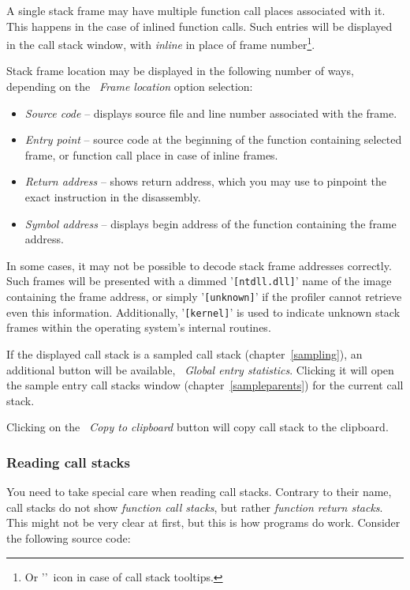 \documentclass[hidelinks,titlepage,a4paper]{article}
\begin{document}
A single stack frame may have multiple function call places associated with it. This happens in the case of inlined function calls. Such entries will be displayed in the call stack window, with \emph{inline} in place of frame number\footnote{Or '\faCaretRight{}'~icon in case of call stack tooltips.}.

Stack frame location may be displayed in the following number of ways, depending on the \emph{\faAt{}~Frame location} option selection:

\begin{itemize}
\item \emph{Source code} -- displays source file and line number associated with the frame.
\item \emph{Entry point} -- source code at the beginning of the function containing selected frame, or function call place in case of inline frames.
\item \emph{Return address} -- shows return address, which you may use to pinpoint the exact instruction in the disassembly.
\item \emph{Symbol address} -- displays begin address of the function containing the frame address.
\end{itemize}

In some cases, it may not be possible to decode stack frame addresses correctly. Such frames will be presented with a dimmed '\texttt{[ntdll.dll]}' name of the image containing the frame address, or simply '\texttt{[unknown]}' if the profiler cannot retrieve even this information. Additionally, '\texttt{[kernel]}' is used to indicate unknown stack frames within the operating system's internal routines.

If the displayed call stack is a sampled call stack (chapter~\ref{sampling}), an additional button will be available, \emph{\faDoorOpen{}~Global entry statistics}. Clicking it will open the sample entry call stacks window (chapter~\ref{sampleparents}) for the current call stack.

Clicking on the \emph{\faClipboard{}~Copy to clipboard} button will copy call stack to the clipboard.

\subsubsection{Reading call stacks}
\label{readingcallstacks}

You need to take special care when reading call stacks. Contrary to their name, call stacks do not show \emph{function call stacks}, but rather \emph{function return stacks}. This might not be very clear at first, but this is how programs do work. Consider the following source code:
\end{document}
